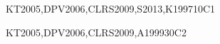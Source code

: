 \begin{syllabus}
\begin{unit}{\ALBasicAnalysis}{}{KT2005,DPV2006,CLRS2009,S2013,K1997}{10}{C1}
\begin{learningoutcomes}
        \item \ALBasicAnalysisLOExplainThe [\Assessment] %
        \item \ALBasicAnalysisLOUseRecurrence [\Assessment] %
        \item \ALBasicAnalysisLOSolve [\Assessment] %
    \end{learningoutcomes}
    \end{unit}
    
    \begin{unit}{\ALAlgorithmicStrategies}{}{KT2005,DPV2006,CLRS2009,A1999}{30}{C2}
    \begin{topics}%
        \item \ALAlgorithmicStrategiesTopicBrute %
        \item \ALAlgorithmicStrategiesTopicGreedy %
        \item \ALAlgorithmicStrategiesTopicDivide %
        \item \ALAlgorithmicStrategiesTopicDynamic %
    \end{topics}
    \begin{learningoutcomes}
        \item \ALAlgorithmicStrategiesLOFor [\Assessment] %
        \item \ALAlgorithmicStrategiesLOUseA [\Assessment] %
        \item \ALAlgorithmicStrategiesLOUseAConquer [\Assessment] %
        \item \ALAlgorithmicStrategiesLOUseDynamic [\Assessment] %
        \item \ALAlgorithmicStrategiesLODetermineAn [\Assessment] %
    \end{learningoutcomes}
    \end{unit}
    

\end{syllabus}
